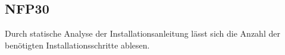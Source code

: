 \subsection*{NFP30}

Durch statische Analyse der Installationsanleitung lässt sich die Anzahl der benötigten Installationsschritte ablesen.